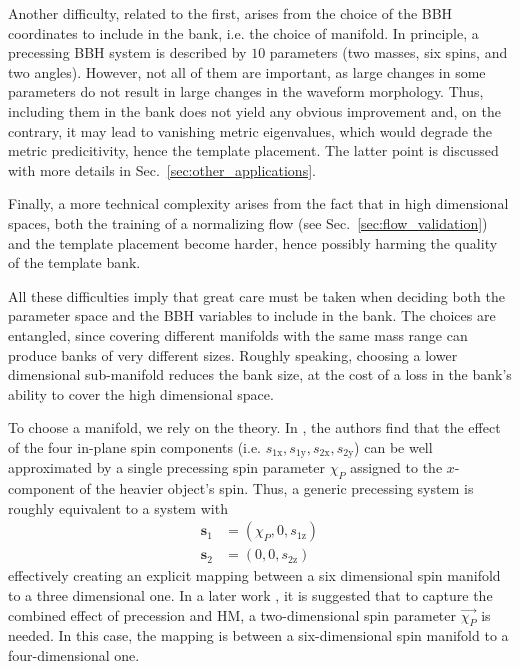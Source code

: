\documentclass[twocolumn,showpacs,preprintnumbers,nofootinbib,prd,
superscriptaddress,10pt]{revtex4-2}
\begin{document}
Another difficulty, related to the first, arises from the choice of the BBH coordinates to include in the bank, i.e. the choice of manifold.
In principle, a precessing BBH system is described by $10$ parameters (two masses, six spins, and two angles).
However, not all of them are important, as large changes in some parameters do not result in large changes in the waveform morphology. Thus, including them in the bank does not yield any obvious improvement and, on the contrary, it may lead to vanishing metric eigenvalues, which would degrade the metric predicitivity, hence the template placement. The latter point is discussed with more details in Sec.~\ref{sec:other_applications}.

Finally, a more technical complexity arises from the fact that in high dimensional spaces, both the training of a normalizing flow (see Sec.~\ref{sec:flow_validation}) and the template placement become harder, hence possibly harming the quality of the template bank.

All these difficulties imply that great care must be taken when deciding both the parameter space and the BBH variables to include in the bank.
The choices are entangled, since covering different manifolds with the same mass range can produce banks of very different sizes.
Roughly speaking, choosing a lower dimensional sub-manifold reduces the bank size, at the cost of a loss in the bank's ability to cover the high dimensional space.

To choose a manifold, we rely on the theory. In \cite{Schmidt:2014iyl}, the authors find that the effect of the four in-plane spin components (i.e. $s_\text{1x}, s_\text{1y}, s_\text{2x}, s_\text{2y}$) can be well approximated by a single precessing spin parameter $\chi_P$ assigned to the $x$-component of the heavier object's spin.
Thus, a generic precessing system is roughly equivalent to a system with
\begin{align*}
	\mathbf{s}_\text{1} &= (\chi_P, 0, s_\text{1z}) \\
	\mathbf{s}_\text{2} &= (0, 0, s_\text{2z})
\end{align*}
effectively creating an explicit mapping between a six dimensional spin manifold to a three dimensional one.
In a later work \cite{Thomas:2020uqj}, it is suggested that to capture the combined effect of precession and HM, a two-dimensional spin parameter $\vec{\chi_P}$ is needed. In this case, the mapping is between  a six-dimensional spin manifold to a four-dimensional one.
\end{document}
